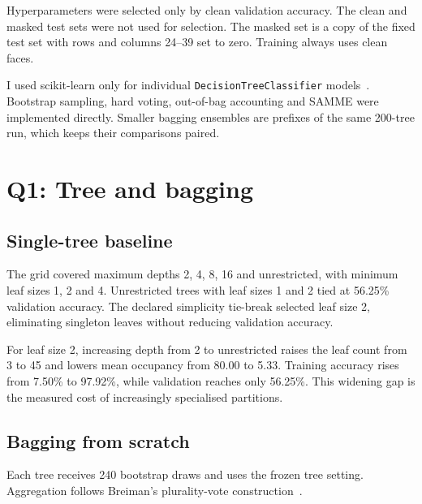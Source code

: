 \documentclass[10pt,twocolumn,letterpaper]{article}
\begin{document}
Hyperparameters were selected only by clean validation accuracy. The clean and masked test sets were not used for selection. The masked set is a copy of the fixed test set with rows and columns 24--39 set to zero. Training always uses clean faces.

I used scikit-learn only for individual \texttt{DecisionTreeClassifier} models~\cite{pedregosa2011}. Bootstrap sampling, hard voting, out-of-bag accounting and SAMME were implemented directly. Smaller bagging ensembles are prefixes of the same 200-tree run, which keeps their comparisons paired.

\section{Q1: Tree and bagging}
\subsection{Single-tree baseline}
The grid covered maximum depths 2, 4, 8, 16 and unrestricted, with minimum leaf sizes 1, 2 and 4. Unrestricted trees with leaf sizes 1 and 2 tied at 56.25\% validation accuracy. The declared simplicity tie-break selected leaf size 2, eliminating singleton leaves without reducing validation accuracy.

\begin{table}[h]
\centering\scriptsize
{}
\end{table}

For leaf size 2, increasing depth from 2 to unrestricted raises the leaf count from 3 to 45 and lowers mean occupancy from 80.00 to 5.33. Training accuracy rises from 7.50\% to 97.92\%, while validation reaches only 56.25\%. This widening gap is the measured cost of increasingly specialised partitions.

\subsection{Bagging from scratch}
Each tree receives 240 bootstrap draws and uses the frozen tree setting. Aggregation follows Breiman's plurality-vote construction~\cite{breiman1996}.
\end{document}
